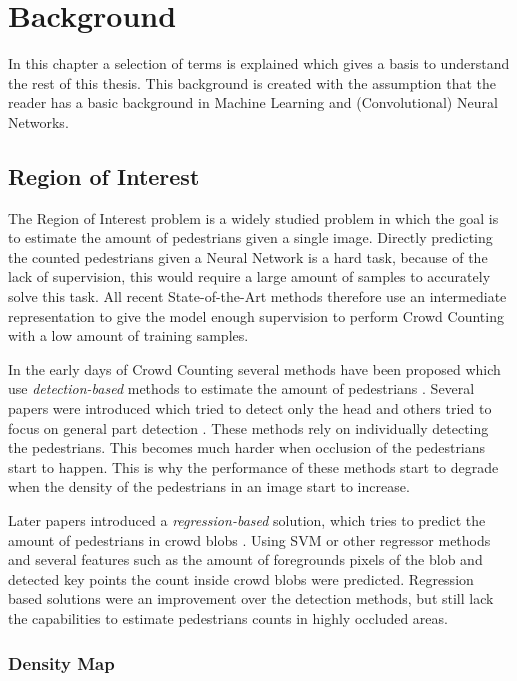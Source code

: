 \chapter{Background}
In this chapter a selection of terms is explained which gives a basis to understand the rest of this thesis. This background is created with the assumption that the reader has a basic background in Machine Learning and (Convolutional) Neural Networks.

\section{Region of Interest}
The Region of Interest problem is a widely studied problem in which the goal is to estimate the amount of pedestrians given a single image. Directly predicting the counted pedestrians given a Neural Network is a hard task, because of the lack of supervision, this would require a large amount of samples to accurately solve this task. All recent State-of-the-Art methods therefore use an intermediate representation to give the model enough supervision to perform Crowd Counting with a low amount of training samples.

In the early days of Crowd Counting several methods have been proposed which use \emph{detection-based} methods to estimate the amount of pedestrians \cite{Dalal2005, Dollar2012} . Several papers were introduced which tried to detect only the head \cite{Subburaman2012} and others tried to focus on general part detection \cite{Wu2007, Lin2010}. These methods rely on individually detecting the pedestrians. This becomes much harder when occlusion of the pedestrians start to happen. This is why the performance of these methods start to degrade when the density of the pedestrians in an image start to increase.

Later papers introduced a \emph{regression-based} solution, which tries to predict the amount of pedestrians in crowd blobs \cite{Chan2009, Idrees2013, zheng_cross-line_2019}. Using SVM or other regressor methods and several features such as the amount of foregrounds pixels of the blob and detected key points the count inside crowd blobs were predicted. Regression based solutions were an improvement over the detection methods, but still lack the capabilities to estimate pedestrians counts in highly occluded areas.

\subsection{Density Map}

